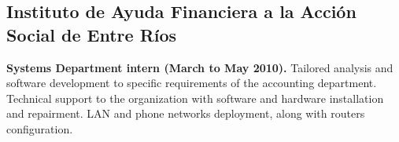 \subsection*{Instituto de Ayuda Financiera a la Acción Social de Entre Ríos}

\textbf{Systems Department intern (March to May 2010).} Tailored analysis and software development to specific requirements of the accounting department. Technical support to the organization with software and hardware installation and repairment. LAN and phone networks deployment, along with routers configuration.

